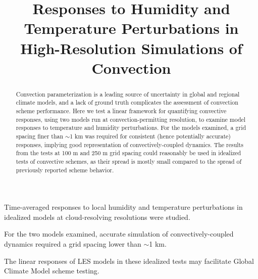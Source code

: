 \documentclass[draft]{agujournal2019}
\begin{document}
\title{Responses to Humidity and Temperature Perturbations in High-Resolution Simulations of Convection}




\begin{keypoints}
    \item Time-averaged responses to local humidity and temperature
    perturbations in idealized models at cloud-resolving resolutions were
    studied.
    \item For the two models examined, accurate simulation of
    convectively-coupled dynamics required a grid spacing lower than $\sim$1 km.
    \item The linear responses of LES models in these idealized tests may
    facilitate Global Climate Model scheme testing.
\end{keypoints}

\justifying

\begin{abstract}
Convection parameterization is a leading source of uncertainty in global and
regional climate models, and a lack of ground truth complicates the assessment
of convection scheme performance. Here we test a linear framework for
quantifying convective responses, using two models run at convection-permitting
resolution, to examine model responses to temperature and humidity
perturbations. For the models examined, a grid spacing finer than $\sim$1 km was
required for consistent (hence potentially accurate) responses, implying good
representation of convectively-coupled dynamics. The results from the tests at
100 m and 250 m grid spacing could reasonably be used in idealized tests of
convective schemes, as their spread is mostly small compared to the spread of
previously reported scheme behavior.
\end{abstract}
\end{document}

